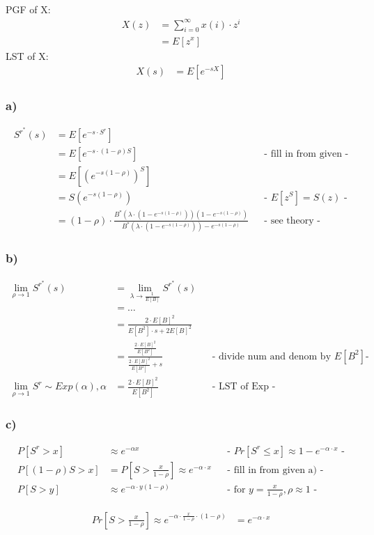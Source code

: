 PGF of X:
\begin{align*}
X\left(z\right)&=\sum _{{i=0}}^{\infty }x\left(i\right)\cdot z^{i}\\
&=E\left[z^{x}\right]
\end{align*}
LST of X:
\begin{align*}
X\left(s\right)&=E\left[e^{{-sX}}\right]
\end{align*}

\subsubsection*{ a) }
\begin{align*}
S^{{r^{{\ast }}}}\left(s\right)&=E\left[e^{{-s \cdot S^{r}}}\right]\\
&=E\left[e^{-s \cdot (1-\rho)S}\right] && \text{- fill in from given -}\\
&=E\left[\left(e^{{-s\left(1-\rho \right)}}\right)^{S}\right]\\
&=S\left(e^{{-s\left(1-\rho \right)}}\right) && \text{- $E[z^S] = S(z)$ -}\\
&=\left(1-\rho \right)\cdot \frac{B^{{\ast }}\left(\lambda \cdot \left(1-e^{{-s\left(1-\rho \right)}}\right)\right)\left(1-e^{{-s\left(1-\rho \right)}}\right)}{B^{{\ast }}\left(\lambda \cdot \left(1-e^{{-s\left(1-\rho \right)}}\right)\right)-e^{{-s\left(1-\rho \right)}}}&& \text{- see theory -}
\end{align*}

\subsubsection*{ b) }
\begin{align*}
\lim _{{\rho \rightarrow 1}}S^{{r^{{\ast }}}}\left(s\right)&=\lim _{{\lambda \rightarrow \frac{1}{E\left[B\right]}}}S^{{r^{{\ast }}}}\left(s\right)\\
&=\ldots \\
&=\frac{2\cdot E\left[B\right]^{2}}{E\left[B^{2}\right]\cdot s+2E\left[B\right]^{2}}\\
&=\frac{\frac{2\cdot E\left[B\right]^{2}}{E\left[B^{2}\right]}}{\frac{2\cdot E\left[B\right]^{2}}{E\left[B^{2}\right]}+s} && \text{- divide num and denom by $E[B^2]$-}\\
\lim _{{\rho \rightarrow 1}}S^{r}\sim Exp \left(\alpha \right),\alpha &=\frac{2\cdot E\left[B\right]^{2}}{E\left[B^{2}\right]} && \text{- LST of Exp -}
\end{align*}

\subsubsection*{ c) }
\begin{align*}
P\left[S^{r}> x\right]&\approx e^{{-\alpha x}}&& \text{-  $Pr\left[S^{r}\le x\right]\approx 1-e^{{-\alpha \cdot x}}$ -}\\
P\left[\left(1-\rho \right)S> x\right]&=P\left[S> \frac{x}{1-\rho }\right]\approx e^{{-\alpha \cdot x}} && \text{- fill in from given a) -}\\
P\left[S> y\right]&\approx e^{{-\alpha \cdot y\left(1-\rho \right)}} && \text{- for $y=\frac{x}{1-\rho }, \rho \approx 1$ -}
\end{align*}

\begin{align*}
Pr\left[S> \frac{x}{1-\rho }\right]\approx e^{{-\alpha \cdot \frac{x}{1-\rho }\cdot \left(1-\rho \right)}}&=e^{{-\alpha \cdot x}}
\end{align*}